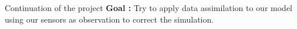 \begin{frame}{Continuation of the project}
	\textbf{Goal :} Try to apply data assimilation to our model using our sensors as observation to correct the simulation.
\end{frame}



